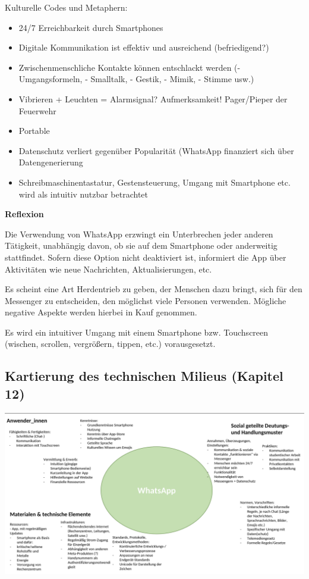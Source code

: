 \documentclass[
  a4paper,
]{book}
\providecommand{\tightlist}{%
  \setlength{\itemsep}{0pt}\setlength{\parskip}{0pt}}
\begin{document}
Kulturelle Codes und Metaphern:

\begin{itemize}
\tightlist
\item
  24/7 Erreichbarkeit durch Smartphones
\item
  Digitale Kommunikation ist effektiv und ausreichend (befriedigend?)
\item
  Zwischenmenschliche Kontakte können entschlackt werden (- Umgangsformeln, - Smalltalk, - Gestik, - Mimik, - Stimme usw.)
\item
  Vibrieren + Leuchten = Alarmsignal? Aufmerksamkeit! Pager/Pieper der Feuerwehr
\item
  Portable
\item
  Datenschutz verliert gegenüber Popularität (WhatsApp finanziert sich über Datengenerierung
\item
  Schreibmaschinentastatur, Gestensteuerung, Umgang mit Smartphone etc. wird als intuitiv nutzbar betrachtet
\end{itemize}

\textbf{Reflexion}

Die Verwendung von WhatsApp erzwingt ein Unterbrechen jeder anderen Tätigkeit, unabhängig davon, ob sie auf dem Smartphone oder anderweitig stattfindet. Sofern diese Option nicht deaktiviert ist, informiert die App über Aktivitäten wie neue Nachrichten, Aktualisierungen, etc.

Es scheint eine Art Herdentrieb zu geben, der Menschen dazu bringt, sich für den Messenger zu entscheiden, den möglichst viele Personen verwenden. Mögliche negative Aspekte werden hierbei in Kauf genommen.

Es wird ein intuitiver Umgang mit einem Smartphone bzw. Touchscreen (wischen, scrollen, vergrößern, tippen, etc.) vorausgesetzt.

\subsection*{Kartierung des technischen Milieus (Kapitel 12)}\label{kartierung-des-technischen-milieus-kapitel-12-1}

\begin{center}\includegraphics{Figures/12-Bsp.2} \end{center}
\end{document}
